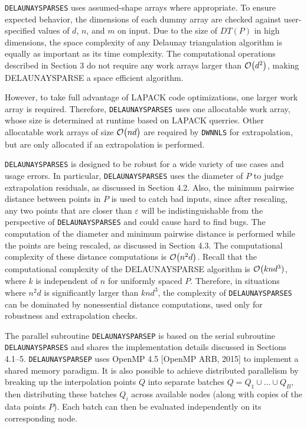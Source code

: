
{\tt DELAUNAYSPARSES} uses assumed-shape arrays where appropriate.
To ensure expected behavior, the dimensions of each dummy array are
checked against user-specified values of $d$, $n$, and $m$ on input.
Due to the size of $DT(P)$ in high dimensions, the space complexity of
any Delaunay triangulation algorithm is equally as important as its
time complexity. The computational operations described in Section 3
do not require any work arrays larger than ${\cal O}\big(d^2\big)$,
making DELAUNAYSPARSE a space efficient algorithm.

However, to take full advantage of LAPACK code optimizations, one
larger work array is required. Therefore, {\tt DELAUNAYSPARSES}
uses one allocatable work array, whose size is determined at runtime
based on LAPACK querries. Other allocatable work arrays of size
${\cal O}\big(nd\big)$ are required by {\tt DWNNLS} for extrapolation,
but are only allocated if an extrapolation is performed.


{\tt DELAUNAYSPARSES} is designed to be robust for a wide variety of
use cases and usage errors. In particular, {\tt DELAUNAYSPARSES} uses
the diameter of $P$ to judge extrapolation residuals, as discussed in
Section 4.2. Also, the minimum pairwise distance between points in
$P$ is used to catch bad inputs, since after rescaling, any two points
that are closer than $\varepsilon$ will be indistinguishable from
the perspective of {\tt DELAUNAYSPARSES} and could cause hard to find
bugs. The computation of the diameter and minimum pairwise distance
is performed while the points are being rescaled, as discussed in
Section 4.3. The computational complexity of these distance computations
is ${\cal O}\big(n^2d\big)$. Recall that the computational complexity of
the DELAUNAYSPARSE algorithm is ${\cal O}\big(knd^3)$, where $k$ is
independent of $n$ for uniformly spaced $P$. Therefore, in situations
where $n^2d$ is significantly larger than $knd^3$, the
complexity of {\tt DELAUNAYSPARSES} can be dominated by nonessential
distance computations, used only for robustness and extrapolation
checks.


The parallel subroutine {\tt DELAUNAYSPARSEP} is based on the serial
subroutine {\tt DELAUNAYSPARSES} and shares the implementation details
discussed in Sections 4.1--5. {\tt DELAUNAYSPARSEP} uses OpenMP 4.5 
[OpenMP ARB, 2015]
to implement a shared memory paradigm. It is also possible to achieve
distributed parallelism by breaking up the interpolation points $Q$ into
separate batches $Q = Q_1 \cup \ldots \cup Q_B$, then distributing these
batches $Q_i$ across available nodes (along with copies of the data points 
$P$). Each batch can then be evaluated independently on its corresponding
node.

